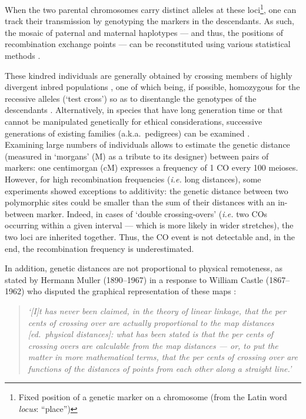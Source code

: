 When the two parental chromosomes carry distinct alleles at these loci\footnote{Fixed position of a genetic marker on a chromosome (from the Latin word \textit{locus}: “place”)}, one can track their transmission by genotyping the markers in the descendants.
As such, the mosaic of paternal and maternal haplotypes — and thus, the positions of recombination exchange points — can be reconstituted using various statistical methods \citep[reviewed in \citealp{backstrom2009gene}]{haldane1919combination, kosambi1943estimation}.

These kindred individuals are generally obtained by crossing members of highly divergent inbred populations \citep[\textit{e.g.}][]{rowe1994maps,dietrich1996comprehensive}, one of which being, if possible, homozygous for the recessive alleles (‘test cross’) so as to disentangle the genotypes of the descendants \citep[reviewed in][]{brown2002mapping}.
Alternatively, in species that have long generation time or that cannot be manipulated genetically for ethical considerations, successive generations of existing families (a.k.a.\ pedigrees) can be examined \citep[\textit{e.g.}][]{kong2002highresolution,kong2010finescale,cox2009new}.\\

Examining large numbers of individuals allows to estimate the genetic distance (measured in ‘morgans’ (M) as a tribute to its designer) between pairs of markers: one centimorgan (cM) expresses a frequency of 1 CO every 100 meioses.
However, for high recombination frequencies (\textit{i.e.} long distances), some experiments \citep[\textit{e.g.}][]{morgan1911random,morgan1912data} showed exceptions to additivity: the genetic distance between two polymorphic sites could be smaller than the sum of their distances with an in-between marker.
Indeed, in cases of ‘double crossing-overs’ (\textit{i.e.} two COs occurring within a given interval — which is more likely in wider stretches), the two loci are inherited together.
Thus, the CO event is not detectable and, in the end, the recombination frequency is underestimated.

In addition, genetic distances are not proportional to physical remoteness, as stated by Hermann Muller (1890--1967) \citep{muller1920are} in a response to William Castle (1867--1962) who disputed the graphical representation of these maps \citep[reviewed in \citealp{vorms2013models}]{castle1919are,castle1919arrangement}:

\begin{quote}
\textit{‘[I]t has never been claimed, in the theory of linear linkage, that the per cents of crossing over are actually proportional to the map distances [ed.\ physical distances]:  what has been stated is that the per cents of crossing overs are calculable from the map distances — or, to put the matter in more mathematical terms, that the per cents of crossing over are functions of the distances of points from each other along a straight line.’}
\end{quote}

